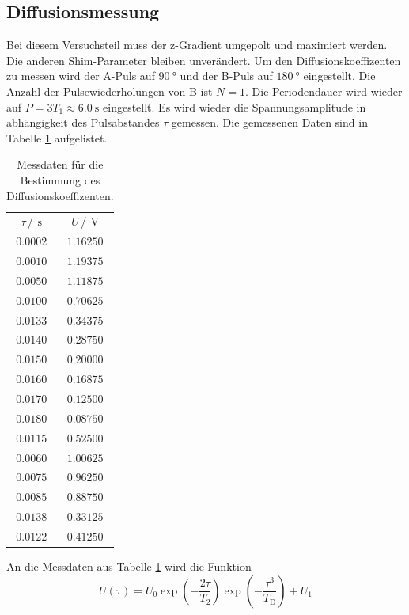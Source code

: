 \subsection{Diffusionsmessung}
Bei diesem Versuchsteil muss der z-Gradient umgepolt und maximiert werden. Die anderen Shim-Parameter bleiben unverändert. 
Um den Diffusionskoeffizenten zu messen wird der A-Puls auf $\SI{90}{\degree}$ und der B-Puls auf $\SI{180}{\degree}$ eingestellt.
Die Anzahl der Pulsewiederholungen von B ist $N=1$. Die Periodendauer wird wieder auf $P=3T_{\text{1}}\approx \SI{6.0}{\second}$ 
eingestellt.
Es wird wieder die Spannungsamplitude in abhängigkeit des Pulsabstandes $\tau$ gemessen.
Die gemessenen Daten sind in Tabelle \ref{tab:Diff_messung} aufgelistet. 
\begin{table}
  \centering
  \caption{Messdaten für die Bestimmung des Diffusionskoeffizenten.}
  \label{tab:Diff_messung}
  \begin{tabular}{c c}
    \toprule
    $\tau$\,/\,$\SI{}{\second}$&$U$\,/\,$\SI{}{\volt}$\\
    $\num{0.0002}$&$\num{1.16250}$\\
    $\num{0.0010}$&$\num{1.19375}$\\
    $\num{0.0050}$&$\num{1.11875}$\\
    $\num{0.0100}$&$\num{0.70625}$\\
    $\num{0.0133}$&$\num{0.34375}$\\
    $\num{0.0140}$&$\num{0.28750}$\\
    $\num{0.0150}$&$\num{0.20000}$\\
    $\num{0.0160}$&$\num{0.16875}$\\
    $\num{0.0170}$&$\num{0.12500}$\\
    $\num{0.0180}$&$\num{0.08750}$\\
    $\num{0.0115}$&$\num{0.52500}$\\
    $\num{0.0060}$&$\num{1.00625}$\\
    $\num{0.0075}$&$\num{0.96250}$\\
    $\num{0.0085}$&$\num{0.88750}$\\
    $\num{0.0138}$&$\num{0.33125}$\\
    $\num{0.0122}$&$\num{0.41250}$\\
    \bottomrule
  \end{tabular}
\end{table}
An die Messdaten aus Tabelle \ref{tab:Diff_messung} wird die Funktion
\begin{equation}
  U(\tau)=U_{\text{0}} \exp{\left(-\frac{2\tau}{T_{\text{2}}}\right)}\exp{\left(-\frac{\tau^3}{T_{\text{D}}}\right)}+U_{\text{1}}
\end{equation}
